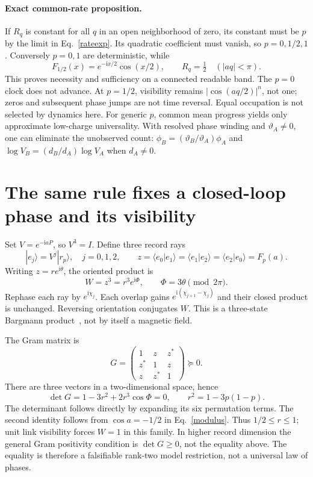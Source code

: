 \documentclass[11pt,a4paper]{article}
\newcommand{\ii}{\mathrm i}
\newcommand{\ket}[1]{|#1\rangle}
\begin{document}
\paragraph{Exact common-rate proposition.}
If $R_q$ is constant for all $q$ in an open neighborhood of zero, its
constant must be $p$ by the limit in Eq.~\eqref{rateexp}. Its quadratic
coefficient must vanish, so $p=0,1/2,1$. Conversely $p=0,1$ are
deterministic, while
\begin{equation}
 F_{1/2}(x)=e^{-\ii x/2}\cos(x/2),\qquad
 R_q=\tfrac12\quad (|aq|<\pi).\label{balanced}
\end{equation}
This proves necessity and sufficiency on a connected readable band.
The $p=0$ clock does not advance. At $p=1/2$, visibility remains
$|\cos(aq/2)|^n$, not one; zeros and subsequent phase jumps are not
time reversal. Equal occupation is not selected by dynamics here.
For generic $p$, common mean progress yields only approximate low-charge
universality. With resolved phase winding and $\vartheta_A\ne0$, one
can eliminate the unobserved count:
$\phi_B=(\vartheta_B/\vartheta_A)\phi_A$ and
$\log V_B=(d_B/d_A)\log V_A$ when $d_A\ne0$.

\newpage
\section{The same rule fixes a closed-loop phase and its visibility}
Set $V=e^{-\ii aP}$, so $V^3=I$. Define three record rays
\begin{equation}
 \ket{e_j}=V^j\ket{r_p},\quad j=0,1,2,\qquad
 z=\langle e_0|e_1\rangle=\langle e_1|e_2\rangle
   =\langle e_2|e_0\rangle=F_p(a).
\end{equation}
Writing $z=r e^{\ii\theta}$, the oriented product is
\begin{equation}
 W=z^3=r^3e^{\ii\Phi},\qquad \Phi=3\theta\pmod{2\pi}.
 \label{loop}
\end{equation}
Rephase each ray by $e^{\ii\chi_j}$. Each overlap gains
$e^{\ii(\chi_{j+1}-\chi_j)}$ and their closed product is unchanged.
Reversing orientation conjugates $W$. This is a three-state Bargmann
product~\cite{bargmann}, not by itself a magnetic field.

The Gram matrix is
\begin{equation}
 G=\begin{pmatrix}1&z&z^*\\z^*&1&z\\z&z^*&1\end{pmatrix}\succeq0.
\end{equation}
There are three vectors in a two-dimensional space, hence
\begin{equation}
 \boxed{\det G=1-3r^2+2r^3\cos\Phi=0},\qquad
 r^2=1-3p(1-p).\label{constraint}
\end{equation}
The determinant follows directly by expanding its six permutation
terms. The second identity follows from
$\cos a=-1/2$ in Eq.~\eqref{modulus}. Thus $1/2\le r\le1$;
unit link visibility forces $W=1$ in this family. In higher record
dimension the general Gram positivity condition is $\det G\ge0$,
not the equality above. The equality is therefore a falsifiable
rank-two model restriction, not a universal law of phases.
\end{document}
